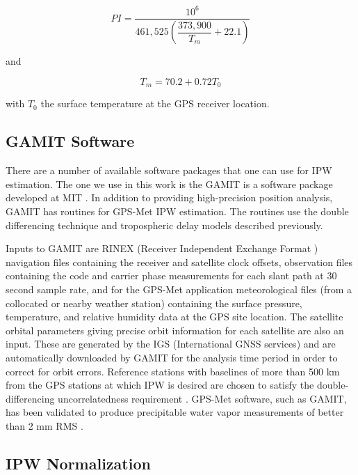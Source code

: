 \documentclass[proposal]{umassthesis}
\begin{document}
{\begin{equation}
PI = \dfrac{10^6}{461,525 ( \dfrac{373,900}{T_m} + 22.1 )}
\end{equation}

and

\begin{equation}
T_m = 70.2 + 0.72 T_0
\end{equation}

with $T_0$ the surface temperature at the GPS receiver location.

\subsection{GAMIT Software}

There are a number of available software packages that one can use for IPW estimation. The one we use in this work is the GAMIT is a software package developed at MIT \cite{herring2015gamit}. In addition to providing high-precision position analysis, GAMIT has routines for GPS-Met IPW estimation. The routines use the double differencing technique and tropospheric delay models described previously.

Inputs to GAMIT are RINEX (Receiver Independent Exchange Format \cite{gurtner2007rinex}) navigation files containing the receiver and satellite clock offsets, observation files containing the code and carrier phase measurements for each slant path at 30 second sample rate, and for the GPS-Met application meteorological files (from a collocated or nearby weather station) containing the surface pressure, temperature, and relative humidity data at the GPS site location. The satellite orbital parameters giving precise orbit information for each satellite are also an input. These are generated by the IGS (International GNSS services) \cite{dow2009international} and are automatically downloaded by GAMIT for the analysis time period in order to correct for orbit errors. Reference stations with baselines of more than 500 km from the GPS stations at which IPW is desired are chosen to satisfy the double-differencing uncorrelatedness requirement \cite{rocken1995gps}. GPS-Met software, such as GAMIT, has been validated to produce precipitable water vapor measurements of better than 2 mm RMS \cite{duan1996gps}.

\subsection{IPW Normalization}

}
\end{document}
